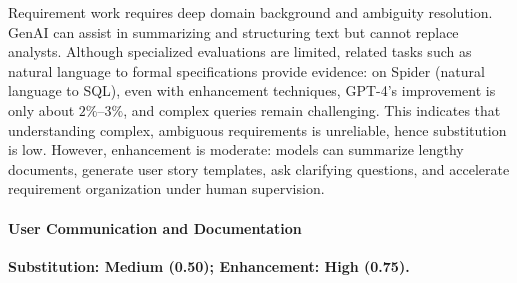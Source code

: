 Requirement work requires deep domain background and ambiguity resolution. GenAI can assist in summarizing and structuring text but cannot replace analysts. Although specialized evaluations are limited, related tasks such as natural language to formal specifications provide evidence: on Spider (natural language to SQL), even with enhancement techniques, GPT-4's improvement is only about $2\%$--$3\%$, and complex queries remain challenging. This indicates that understanding complex, ambiguous requirements is unreliable, hence substitution is low. However, enhancement is moderate: models can summarize lengthy documents, generate user story templates, ask clarifying questions, and accelerate requirement organization under human supervision.\paragraph{User Communication and Documentation}\textbf{Substitution: Medium (0.50); Enhancement: High (0.75).}
